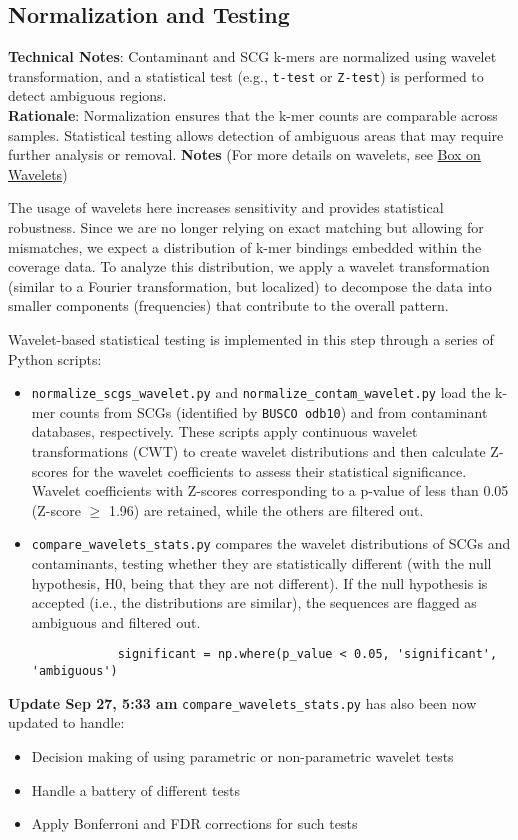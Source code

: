 \documentclass[11pt]{report}
\begin{document}
{\subsection{Normalization and Testing} \textbf{Technical Notes}: Contaminant and SCG k-mers are normalized using wavelet transformation, and a statistical test (e.g., \texttt{t-test} or \texttt{Z-test}) is performed to detect ambiguous regions.\\
\textbf{Rationale}: Normalization ensures that the k-mer counts are comparable across samples. Statistical testing allows detection of ambiguous areas that may require further analysis or removal. 
\textbf{Notes} (For more details on wavelets, see \hyperref[box:wavelets]{Box on Wavelets})


\begin{tcolorbox}[coltitle=white, title=Personal Notes, breakable]
	The usage of wavelets here increases sensitivity and provides statistical robustness. Since we are no longer relying on exact matching but allowing for mismatches, we expect a distribution of k-mer bindings embedded within the coverage data. To analyze this distribution, we apply a wavelet transformation (similar to a Fourier transformation, but localized) to decompose the data into smaller components (frequencies) that contribute to the overall pattern.
	
	Wavelet-based statistical testing is implemented in this step through a series of Python scripts:
	\begin{itemize}
		\item \texttt{normalize\_scgs\_wavelet.py} and \texttt{normalize\_contam\_wavelet.py} load the k-mer counts from SCGs (identified by \texttt{BUSCO odb10}) and from contaminant databases, respectively. These scripts apply continuous wavelet transformations (CWT) to create wavelet distributions and then calculate Z-scores for the wavelet coefficients to assess their statistical significance. Wavelet coefficients with Z-scores corresponding to a p-value of less than 0.05 (Z-score $\geq$ 1.96) are retained, while the others are filtered out.
		\item \texttt{compare\_wavelets\_stats.py} compares the wavelet distributions of SCGs and contaminants, testing whether they are statistically different (with the null hypothesis, H0, being that they are not different). If the null hypothesis is accepted (i.e., the distributions are similar), the sequences are flagged as ambiguous and filtered out.
		\begin{verbatim}
			significant = np.where(p_value < 0.05, 'significant', 'ambiguous')
		\end{verbatim}
	\end{itemize}
	\textbf{Update Sep 27, 5:33 am}
	\texttt{compare\_wavelets\_stats.py} has also been now updated to handle:
		\begin{itemize}
			\item Decision making of using parametric or non-parametric wavelet tests
			\item Handle a battery of different tests
			\item Apply Bonferroni and FDR corrections for such tests 
		\end{itemize}
\end{tcolorbox}

}
\end{document}
